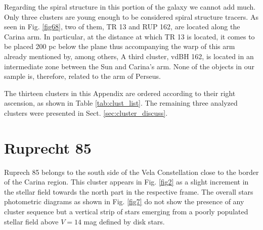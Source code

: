\documentclass{aa}
\begin{document}
Regarding the spiral structure in this portion of the galaxy we cannot add
much. Only three clusters are young enough to be considered spiral structure
tracers. As seen in Fig. \ref{fig68}, two of them, TR 13 and RUP 162, are
located along the Carina arm. In particular, at the distance at which TR 13 is
located, it comes to be placed 200 pc below the plane thus accompanying the
warp of this arm already mentioned by, among others, \cite{Cersosimo_2009}
A third cluster, vdBH 162, is located in an intermediate zone between the Sun
and Carina's arm. None of the objects in our sample is, therefore, related to
the arm of Perseus.






















































\appendix

The thirteen clusters in this Appendix are ordered according to their right
ascension, as shown in Table \ref{tab:clust_list}. The remaining three analyzed
clusters were presented in Sect. \ref{sec:cluster_discuss}.

\section{Ruprecht 85}

Ruprech 85 belongs to the south side of the Vela Constellation close to the
border of the Carina region. This cluster appears in Fig. \ref{fig2} as a slight
increment in the stellar field towards the north part in the respective frame.
The overall stars photometric diagrams as shown in Fig. \ref{fig7} do not show
the presence of any cluster sequence but a vertical strip of stars emerging from
a poorly populated stellar field above $V= 14$ mag defined by disk stars.\\
\end{document}
